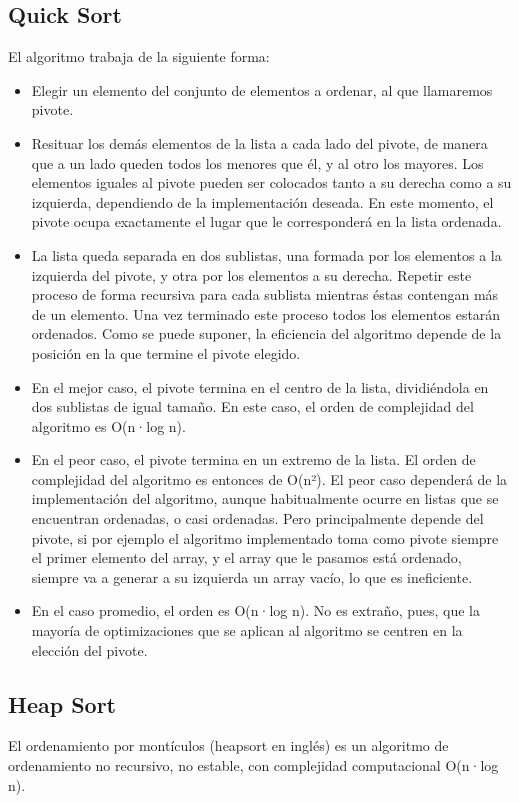 \documentclass{article}
\begin{document}
	\subsection{Quick Sort}
	El algoritmo trabaja de la siguiente forma:
	\begin{itemize}
		\item Elegir un elemento del conjunto de elementos a ordenar, al que llamaremos pivote.
		\item Resituar los demás elementos de la lista a cada lado del pivote, de manera que a un lado queden todos los menores que él, y al otro los mayores. Los elementos iguales al pivote pueden ser colocados tanto a su derecha como a su izquierda, dependiendo de la implementación deseada. En este momento, el pivote ocupa exactamente el lugar que le corresponderá en la lista ordenada.
		\item La lista queda separada en dos sublistas, una formada por los elementos a la izquierda del pivote, y otra por los elementos a su derecha.
		Repetir este proceso de forma recursiva para cada sublista mientras éstas contengan más de un elemento. Una vez terminado este proceso todos los elementos estarán ordenados.
		Como se puede suponer, la eficiencia del algoritmo depende de la posición en la que termine el pivote elegido.
		
		\item En el mejor caso, el pivote termina en el centro de la lista, dividiéndola en dos sublistas de igual tamaño. En este caso, el orden de complejidad del algoritmo es O(n·log n).
		\item En el peor caso, el pivote termina en un extremo de la lista. El orden de complejidad del algoritmo es entonces de O(n²). El peor caso dependerá de la implementación del algoritmo, aunque habitualmente ocurre en listas que se encuentran ordenadas, o casi ordenadas. Pero principalmente depende del pivote, si por ejemplo el algoritmo implementado toma como pivote siempre el primer elemento del array, y el array que le pasamos está ordenado, siempre va a generar a su izquierda un array vacío, lo que es ineficiente.
		\item En el caso promedio, el orden es O(n·log n).
		No es extraño, pues, que la mayoría de optimizaciones que se aplican al algoritmo se centren en la elección del pivote.
	\end{itemize}
	
	\subsection{Heap Sort}
	El ordenamiento por montículos (heapsort en inglés) es un algoritmo de ordenamiento no recursivo, no estable, con complejidad computacional O(n·log n).
	
\end{document}
